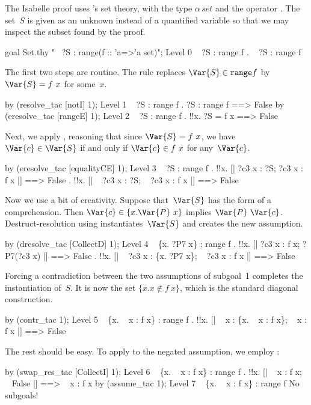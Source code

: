 The Isabelle proof uses \HOL's set theory, with the type $\alpha\,set$ and
the operator .  The set~$S$ is given as an unknown instead of a
quantified variable so that we may inspect the subset found by the proof.
\begin{ttbox}
goal Set.thy "~ ?S : range(f :: 'a=>'a set)";
{\out Level 0}
{\out ~ ?S : range f}
{. ~ ?S : range f}
\end{ttbox}
The first two steps are routine.  The rule  replaces
$\Var{S}\in {\tt range} f$ by $\Var{S}=f~x$ for some~$x$.
\begin{ttbox}
by (resolve_tac [notI] 1);
{\out Level 1}
{\out ~ ?S : range f}
{. ?S : range f ==> False}
\ttbreak
by (eresolve_tac [rangeE] 1);
{\out Level 2}
{\out ~ ?S : range f}
{. !!x. ?S = f x ==> False}
\end{ttbox}
Next, we apply , reasoning that since $\Var{S}=f~x$,
we have $\Var{c}\in \Var{S}$ if and only if $\Var{c}\in f~x$ for
any~$\Var{c}$.
\begin{ttbox}
by (eresolve_tac [equalityCE] 1);
{\out Level 3}
{\out ~ ?S : range f}
{. !!x. [| ?c3 x : ?S; ?c3 x : f x |] ==> False}
{. !!x. [| ~ ?c3 x : ?S; ~ ?c3 x : f x |] ==> False}
\end{ttbox}
Now we use a bit of creativity.  Suppose that~$\Var{S}$ has the form of a
comprehension.  Then $\Var{c}\in\{x.\Var{P}~x\}$ implies
$\Var{P}~\Var{c}$.   Destruct-resolution using 
instantiates~$\Var{S}$ and creates the new assumption.
\begin{ttbox}
by (dresolve_tac [CollectD] 1);
{\out Level 4}
{\out ~ \{x. ?P7 x\} : range f}
{. !!x. [| ?c3 x : f x; ?P7(?c3 x) |] ==> False}
{. !!x. [| ~ ?c3 x : \{x. ?P7 x\}; ~ ?c3 x : f x |] ==> False}
\end{ttbox}
Forcing a contradiction between the two assumptions of subgoal~1 completes
the instantiation of~$S$.  It is now the set $\{x. x\not\in f~x\}$, which
is the standard diagonal construction.
\begin{ttbox}
by (contr_tac 1);
{\out Level 5}
{\out ~ \{x. ~ x : f x\} : range f}
{. !!x. [| ~ x : \{x. ~ x : f x\}; ~ x : f x |] ==> False}
\end{ttbox}
The rest should be easy.  To apply  to the negated
assumption, we employ :
\begin{ttbox}
by (swap_res_tac [CollectI] 1);
{\out Level 6}
{\out ~ \{x. ~ x : f x\} : range f}
{. !!x. [| ~ x : f x; ~ False |] ==> ~ x : f x}
\ttbreak
by (assume_tac 1);
{\out Level 7}
{\out ~ \{x. ~ x : f x\} : range f}
{\out No subgoals!}
\end{ttbox}
